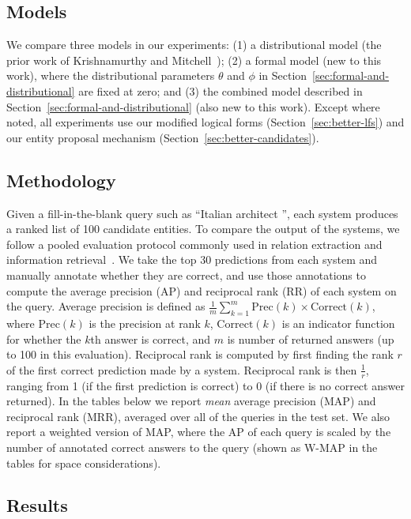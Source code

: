 \documentclass[11pt]{article}
\newcommand{\secref}[1]{Section~\ref{sec:#1}}
\newcommand{\blank}{\underline{\hspace{.5cm}}}
\begin{document}
\subsection{Models}

We compare three models in our experiments: (1) a distributional model
(the prior work of Krishnamurthy and
Mitchell~); (2)
a formal model (new to this work), where the distributional parameters
$\theta$ and $\phi$ in \secref{formal-and-distributional} are fixed at
zero; and (3) the combined model described in
\secref{formal-and-distributional} (also new to this work).  Except
where noted, all experiments use our modified logical forms
(\secref{better-lfs}) and our entity proposal mechanism
(\secref{better-candidates}).

\subsection{Methodology}

Given a fill-in-the-blank query such as ``Italian architect
\blank{}'', each system produces a ranked list of 100 candidate
entities.  To compare the output of the systems, we follow a pooled
evaluation protocol commonly used in relation extraction and
information
retrieval~\cite{west-2014-kbc-via-qa,riedel-2013-mf-universal-schema}.
We take the top 30 predictions from each system and manually annotate
whether they are correct, and use those annotations to compute the
average precision (AP) and reciprocal rank (RR) of each system on the
query.  Average precision is defined as $\frac{1}{m}\sum^m_{k=1}
\mathrm{Prec}(k) \times \mathrm{Correct}(k)$, where $\mathrm{Prec}(k)$
is the precision at rank $k$, $\mathrm{Correct}(k)$ is an indicator
function for whether the $k$th answer is correct, and $m$ is number of
returned answers (up to 100 in this evaluation).  Reciprocal rank is
computed by first finding the rank $r$ of the first correct prediction
made by a system.  Reciprocal rank is then $\frac{1}{r}$, ranging from
1 (if the first prediction is correct) to 0 (if there is no correct
answer returned).  In the tables below we report \emph{mean} average
precision (MAP) and reciprocal rank (MRR), averaged over all of the
queries in the test set.  We also report a weighted version of MAP,
where the AP of each query is scaled by the number of annotated
correct answers to the query (shown as W-MAP in the tables for space
considerations).

\subsection{Results}
\end{document}
